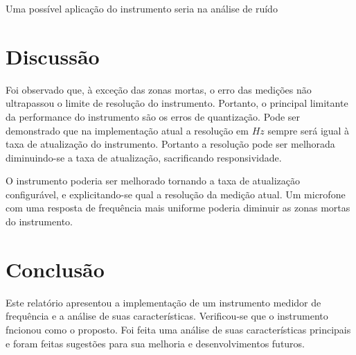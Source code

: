 \documentclass[a4paper,9pt,twocolumn]{article}
\begin{document}
Uma possível aplicação do instrumento seria na análise de ruído 

\section{Discussão}

Foi observado que, à exceção das zonas mortas, o erro das medições não ultrapassou o limite de resolução do instrumento. Portanto, o 
principal limitante da performance do instrumento são os erros de quantização. Pode ser demonstrado que na implementação atual a resolução em $Hz$ sempre
será igual à taxa de atualização do instrumento. Portanto a resolução pode ser melhorada diminuindo-se a taxa de atualização, 
sacrificando responsividade.

O instrumento poderia ser melhorado tornando a taxa de atualização configurável, e explicitando-se qual a resolução da medição atual. Um microfone 
com uma resposta de frequência mais uniforme poderia diminuir as zonas mortas do instrumento.


\section{Conclusão}

Este relatório apresentou a implementação de um instrumento medidor de frequência e a análise de suas características. Verificou-se que o
instrumento fncionou como o proposto. Foi feita uma análise de suas características principais e foram feitas sugestões para sua melhoria
e desenvolvimentos futuros.
\end{document}
